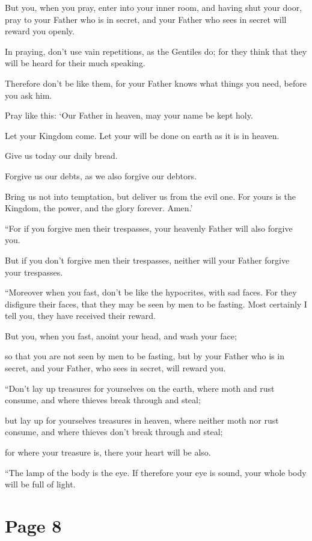 But you, when you pray, enter into your inner room, and having shut your door, pray to your Father who is in secret, and your Father who sees in secret will reward you openly.

In praying, don’t use vain repetitions, as the Gentiles do; for they think that they will be heard for their much speaking.

Therefore don’t be like them, for your Father knows what things you need, before you ask him.

Pray like this: ‘Our Father in heaven, may your name be kept holy.

Let your Kingdom come. Let your will be done on earth as it is in heaven.

Give us today our daily bread.

Forgive us our debts, as we also forgive our debtors.

Bring us not into temptation, but deliver us from the evil one. For yours is the Kingdom, the power, and the glory forever. Amen.’

“For if you forgive men their trespasses, your heavenly Father will also forgive you.

But if you don’t forgive men their trespasses, neither will your Father forgive your trespasses.

“Moreover when you fast, don’t be like the hypocrites, with sad faces. For they disfigure their faces, that they may be seen by men to be fasting. Most certainly I tell you, they have received their reward.

But you, when you fast, anoint your head, and wash your face;

so that you are not seen by men to be fasting, but by your Father who is in secret, and your Father, who sees in secret, will reward you.

“Don’t lay up treasures for yourselves on the earth, where moth and rust consume, and where thieves break through and steal;

but lay up for yourselves treasures in heaven, where neither moth nor rust consume, and where thieves don’t break through and steal;

for where your treasure is, there your heart will be also.

“The lamp of the body is the eye. If therefore your eye is sound, your whole body will be full of light.



\chapterornament
\section*{Page 8}

